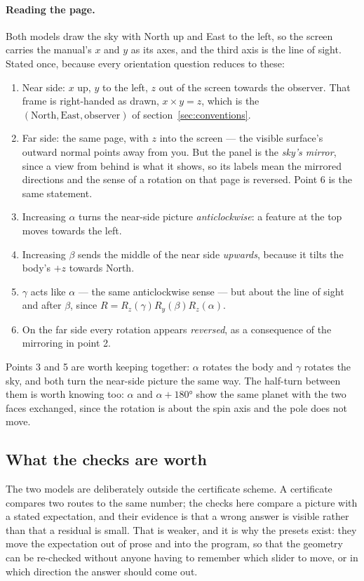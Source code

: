 \paragraph{Reading the page.}  Both models draw the sky with North up and East to the left, so
the screen carries the manual's $x$ and $y$ as its axes, and the third axis is the line of
sight.  Stated once, because every orientation question reduces to these:
\begin{enumerate}
  \item Near side: $x$ up, $y$ to the left, $z$ out of the screen towards the observer.  That
    frame is right-handed as drawn, $x\times y = z$, which is the
    $(\text{North},\text{East},\text{observer})$ of section~\ref{sec:conventions}.
  \item Far side: the same page, with $z$ into the screen --- the visible surface's outward
    normal points away from you.  But the panel is the \emph{sky's mirror}, since a view from
    behind is what it shows, so its labels mean the mirrored directions and the sense of a
    rotation on that page is reversed.  Point 6 is the same statement.
  \item Increasing $\alpha$ turns the near-side picture \emph{anticlockwise}: a feature at the
    top moves towards the left.
  \item Increasing $\beta$ sends the middle of the near side \emph{upwards}, because it tilts
    the body's $+z$ towards North.
  \item $\gamma$ acts like $\alpha$ --- the same anticlockwise sense --- but about the line of
    sight and after $\beta$, since $R = R_z(\gamma)R_y(\beta)R_z(\alpha)$.
  \item On the far side every rotation appears \emph{reversed}, as a consequence of the
    mirroring in point 2.
\end{enumerate}
Points 3 and 5 are worth keeping together: $\alpha$ rotates the body and $\gamma$ rotates the
sky, and both turn the near-side picture the same way.  The half-turn between them is worth
knowing too: $\alpha$ and $\alpha + 180°$ show the same planet with the two faces exchanged,
since the rotation is about the spin axis and the pole does not move.

\subsection{What the checks are worth}
\label{sec:models-worth}

The two models are deliberately outside the certificate scheme.  A certificate compares two
routes to the same number; the checks here compare a picture with a stated expectation, and
their evidence is that a wrong answer is visible rather than that a residual is small.  That
is weaker, and it is why the presets exist: they move the expectation out of prose and into
the program, so that the geometry can be re-checked without anyone having to remember which
slider to move, or in which direction the answer should come out.
